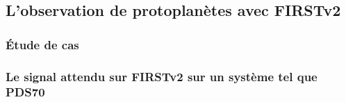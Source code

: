 \subsection{L'observation de protoplanètes avec FIRSTv2}
\label{sec:ObsProto}


\subsubsection{Étude de cas}






\subsubsection{Le signal attendu sur FIRSTv2 sur un système tel que PDS70}

